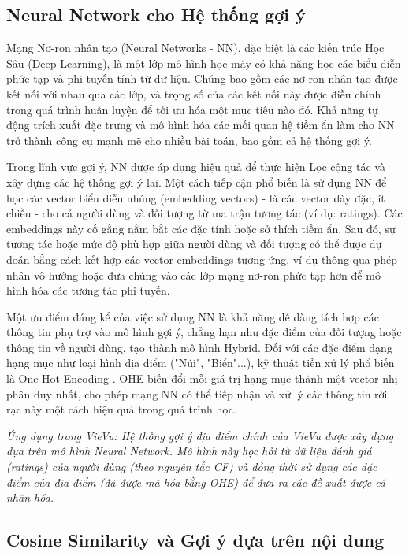 \subsection{Neural Network cho Hệ thống gợi ý}

Mạng Nơ-ron nhân tạo (Neural Networks - NN), đặc biệt là các kiến trúc Học Sâu (Deep Learning), là một lớp mô hình học máy có khả năng học các biểu diễn phức tạp và phi tuyến tính từ dữ liệu. Chúng bao gồm các nơ-ron nhân tạo được kết nối với nhau qua các lớp, và trọng số của các kết nối này được điều chỉnh trong quá trình huấn luyện để tối ưu hóa một mục tiêu nào đó. Khả năng tự động trích xuất đặc trưng và mô hình hóa các mối quan hệ tiềm ẩn làm cho NN trở thành công cụ mạnh mẽ cho nhiều bài toán, bao gồm cả hệ thống gợi ý.

Trong lĩnh vực gợi ý, NN được áp dụng hiệu quả để thực hiện Lọc cộng tác và xây dựng các hệ thống gợi ý lai. Một cách tiếp cận phổ biến là sử dụng NN để học các vector biểu diễn nhúng (embedding vectors) - là các vector dày đặc, ít chiều - cho cả người dùng và đối tượng từ ma trận tương tác (ví dụ: ratings). Các embeddings này cố gắng nắm bắt các đặc tính hoặc sở thích tiềm ẩn. Sau đó, sự tương tác hoặc mức độ phù hợp giữa người dùng và đối tượng có thể được dự đoán bằng cách kết hợp các vector embeddings tương ứng, ví dụ thông qua phép nhân vô hướng hoặc đưa chúng vào các lớp mạng nơ-ron phức tạp hơn để mô hình hóa các tương tác phi tuyến.

Một ưu điểm đáng kể của việc sử dụng NN là khả năng dễ dàng tích hợp các thông tin phụ trợ vào mô hình gợi ý, chẳng hạn như đặc điểm của đối tượng hoặc thông tin về người dùng, tạo thành mô hình Hybrid. Đối với các đặc điểm dạng hạng mục như loại hình địa điểm ("Núi", "Biển"...), kỹ thuật tiền xử lý phổ biến là One-Hot Encoding  \cite{ohe_concept}. OHE biến đổi mỗi giá trị hạng mục thành một vector nhị phân duy nhất, cho phép mạng NN có thể tiếp nhận và xử lý các thông tin rời rạc này một cách hiệu quả trong quá trình học.

\textit{Ứng dụng trong VieVu: Hệ thống gợi ý địa điểm chính của VieVu được xây dựng dựa trên mô hình Neural Network. Mô hình này học hỏi từ dữ liệu đánh giá (ratings) của người dùng (theo nguyên tắc CF) và đồng thời sử dụng các đặc điểm của địa điểm (đã được mã hóa bằng OHE) để đưa ra các đề xuất được cá nhân hóa.}


\subsection{Cosine Similarity và Gợi ý dựa trên nội dung}


